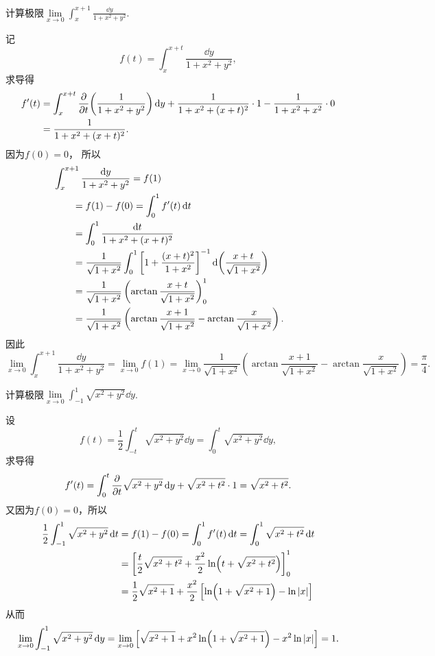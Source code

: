 \begin{example}%
计算极限\(\lim\limits_{x\to0} \int_x^{x+1} \frac{\dd{y}}{1+x^2+y^2}\).
\begin{solution}
记\[
	f(t) = \int_x^{x+t} \frac{\dd{y}}{1+x^2+y^2},
\]
求导得\begin{align*}
	f'(t)
	&= \int_x^{x+t} \pdv{t}(\frac{1}{1+x^2+y^2}) \dd{y}
	+ \frac{1}{1+x^2+(x+t)^2} \cdot 1
	- \frac{1}{1+x^2+x^2} \cdot 0 \\
	&= \frac{1}{1+x^2+(x+t)^2}.
\end{align*}
因为\(f(0) = 0\)，
所以
\begin{align*}
	&\hspace{-20pt}
	\int_x^{x+1} \frac{\dd{y}}{1+x^2+y^2}
	= f(1) \\
	&= f(1) - f(0)
	= \int_0^1 f'(t) \dd{t} \\
	&= \int_0^1 \frac{\dd{t}}{1+x^2+(x+t)^2} \\
	&= \frac{1}{\sqrt{1+x^2}}
		\int_0^1 \left[1+\frac{(x+t)^2}{1+x^2}\right]^{-1} \dd(\frac{x+t}{\sqrt{1+x^2}}) \\
	&= \frac{1}{\sqrt{1+x^2}}
		\left(\arctan\frac{x+t}{\sqrt{1+x^2}}\right)_0^1 \\
	&= \frac{1}{\sqrt{1+x^2}}
		\left(
			\arctan\frac{x+1}{\sqrt{1+x^2}}
			- \arctan\frac{x}{\sqrt{1+x^2}}
		\right).
\end{align*}
因此\[
	\lim\limits_{x\to0} \int_x^{x+1} \frac{\dd{y}}{1+x^2+y^2}
	= \lim\limits_{x\to0} f(1)
	= \lim\limits_{x\to0} \frac{1}{\sqrt{1+x^2}} \left(
		\arctan\frac{x+1}{\sqrt{1+x^2}}
		- \arctan\frac{x}{\sqrt{1+x^2}}
	\right)
	= \frac{\pi}{4}.
\]
\end{solution}
\end{example}

\begin{example}%
\def\l{\lim\limits_{x\to0}}%
计算极限\(\l \int_{-1}^1 \sqrt{x^2+y^2} \dd{y}\).
\begin{solution}
设\[
f(t)
=\frac{1}{2} \int_{-t}^t \sqrt{x^2+y^2} \dd{y}
=\int_0^t \sqrt{x^2+y^2} \dd{y},
\]
求导得\[
f'(t)
= \int_0^t \pdv{t} \sqrt{x^2+y^2} \dd{y}
	+ \sqrt{x^2+t^2} \cdot 1
= \sqrt{x^2+t^2}.
\]又因为\(f(0) = 0\)，所以\begin{align*}
\frac{1}{2} \int_{-1}^1 \sqrt{x^2+y^2} \dd{t}
&=f(1) - f(0)
= \int_0^1 f'(t) \dd{t}
= \int_0^1 \sqrt{x^2+t^2} \dd{t} \\
&= \left[
\frac{t}{2} \sqrt{x^2+t^2} + \frac{x^2}{2} \ln(t+\sqrt{x^2+t^2})
\right]_0^1 \\
&= \frac{1}{2} \sqrt{x^2+1} + \frac{x^2}{2} \left[ \ln(1+\sqrt{x^2+1}) - \ln\abs{x} \right]
\end{align*}
从而\[
\l \int_{-1}^1 \sqrt{x^2+y^2} \dd{y}
= \l \left[
\sqrt{x^2+1}
+ x^2 \ln(1+\sqrt{x^2+1}) - x^2 \ln\abs{x}
\right]
= 1.
\]
\end{solution}
\end{example}

